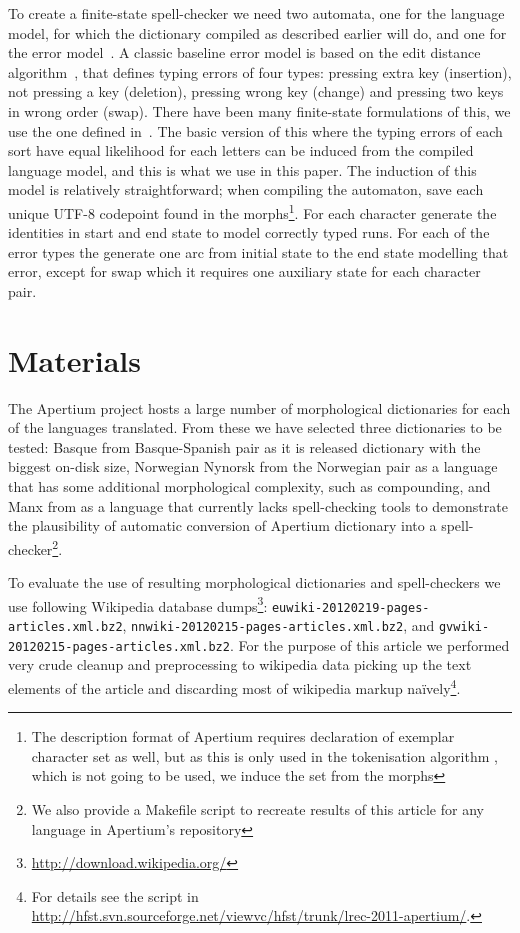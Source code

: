 \documentclass[10pt,a4paper]{article}
\begin{document}
To create a finite-state spell-checker we need two automata, one for the
language model, for which the dictionary compiled as described earlier will do,
and one for the error model~\cite{pirinen/2010/lrec}. A classic baseline error
model is based on the edit distance
algorithm~\cite{levenshtein/1966,damerau/1964}, that defines typing errors of
four types: pressing extra key (insertion), not pressing a key (deletion),
pressing wrong key (change) and pressing two keys in wrong order (swap). There
have been many finite-state formulations of this, we use the one defined
in~\cite{schulz/2002,pirinen/2010/lrec}. The basic version of this where the
typing errors of each sort have equal likelihood for each letters can be
induced from the compiled language model, and this is what we use in this
paper. The induction of this model is relatively straightforward; when
compiling the automaton, save each unique UTF-8 codepoint found in the
morphs\footnote{The description format of Apertium requires declaration of
exemplar character set as well, but as this is only used in the tokenisation
algorithm \cite{garrido-alenda02} , which is not going to be used, we induce
the set from the morphs}. For each character generate the identities in start
and end state to model correctly typed runs. For each of the error types the
generate one arc from initial state to the end state modelling that error,
except for swap which it requires one auxiliary state for each character pair.

\section{Materials}
\label{sec:materials}

The Apertium project hosts a large number of morphological dictionaries for
each of the languages translated. From these we have selected three
dictionaries to be tested: Basque from Basque-Spanish pair as it is 
released dictionary with the biggest on-disk size, Norwegian Nynorsk from the Norwegian pair as a language
that has some additional morphological complexity, such as compounding, and
Manx from  as a language that currently lacks spell-checking tools to
demonstrate the plausibility of automatic conversion of Apertium dictionary
into a spell-checker\footnote{We also provide a Makefile script to
recreate results of this article for any language in Apertium's repository}.

To evaluate the use of resulting morphological dictionaries and spell-checkers
we use following Wikipedia database
dumps\footnote{\url{http://download.wikipedia.org/}}:
\texttt{euwiki-20120219-pages-articles.xml.bz2},
\texttt{nnwiki-20120215-pages-articles.xml.bz2}, and
\texttt{gvwiki-20120215-pages-articles.xml.bz2}. For the purpose of this
article we performed very crude cleanup and preprocessing to wikipedia data
picking up the text elements of the article and discarding most of wikipedia
markup naïvely\footnote{For details see the script in
\url{http://hfst.svn.sourceforge.net/viewvc/hfst/trunk/lrec-2011-apertium/}.}.
\end{document}
